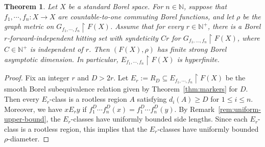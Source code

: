 \documentclass[11pt, reqno, a4paper]{amsart}
\newtheorem{theorem}{Theorem}[section]
\theoremstyle{definition}
\theoremstyle{plain}
\begin{document}
\begin{theorem}
\label{thm:asdim}
Let $X$ be a standard Borel space. For $n\in\mathbb{N}$, suppose that $f_1,\cdots,f_n:X\to X$ are countable-to-one commuting Borel functions, and let $\rho$ be the graph metric on $G_{f_1,\cdots,f_n}\upharpoonright F(X)$. Assume that for every $r\in\mathbb N^+$, there is a Borel $r$-forward-independent hitting set with syndeticity $Cr$ for $G_{f_1,\ldots,f_n}\upharpoonright F(X)$, where $C\in\mathbb N^+$ is independent of $r$. 
Then $(F(X),\rho)$ has finite strong Borel asymptotic dimension. In particular,
$E_{f_1,\cdots,f_n}\upharpoonright F(X)$ is hyperfinite.
\end{theorem}
\begin{proof}
Fix an integer $r$ and $ D> 2r$. Let $E_r:=R_D\subseteq E_{f_1,\cdots,f_n}\upharpoonright F(X)$
be the smooth Borel subequivalence relation given by Theorem~\ref{thm:markers} for $D$. Then every $E_r$-class is a rootless region $A$ satisfying
$d_i(A) \ge D$
for $1 \le i \le n$.
Moreover, we have $ xE_r y$ if $f_1^D\cdots f_n^D(x)=f_1^D\cdots f_n^D(y)$. 
By Remark~\ref{rem:uniform-upper-bound}, the $E_r$-classes have uniformly
bounded side lengths. Since each $E_r$-class is a rootless region, this implies
that the $E_r$-classes have uniformly bounded $\rho$-diameter.


\end{proof}
\end{document}
